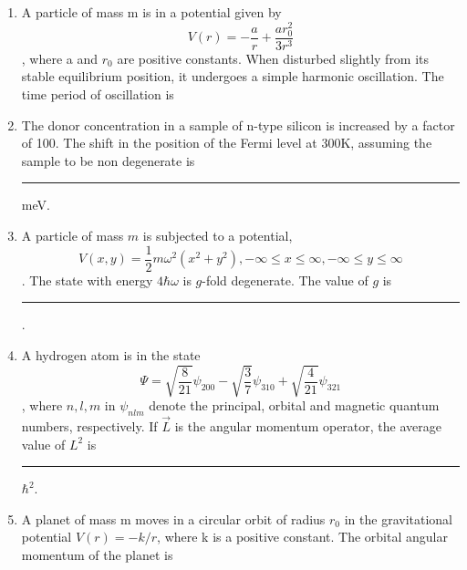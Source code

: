 \documentclass[journal,12pt,onecolumn]{IEEEtran}
\theoremstyle{remark}
\begin{document}
\begin{enumerate}
\item A particle of mass m is in a potential given by $$V(r) = -\frac{a}{r} + \frac{ar_0^2}{3r^3}$$, where a and $r_0$ are positive constants. When disturbed slightly from its stable equilibrium position, it undergoes a simple harmonic oscillation. The time period of oscillation is
\hfill{} \begin{enumerate}  \end{enumerate}

\item The donor concentration in a sample of n-type silicon is increased by a factor of 100. The shift in the position of the Fermi level at 300K, assuming the sample to be non degenerate is \rule{3cm}{0.4pt} meV. \hfill{}

\item A particle of mass $m$ is subjected to a potential, $$V(x,y) = \frac{1}{2} m\omega^2(x^2+y^2), -\infty \le x \le \infty, -\infty \le y \le \infty$$. The state with energy $4\hbar\omega$ is $g$-fold degenerate. The value of $g$ is \rule{3cm}{0.4pt}.\hfill{}

\item A hydrogen atom is in the state $$\Psi = \sqrt{\frac{8}{21}}\psi_{200} - \sqrt{\frac{3}{7}}\psi_{310} + \sqrt{\frac{4}{21}}\psi_{321}$$, where $n,l,m$ in $\psi_{nlm}$ denote the principal, orbital and magnetic quantum numbers, respectively. If $\vec{L}$ is the angular momentum operator, the average value of $L^2$ is \rule{3cm}{0.4pt} $\hbar^2$.\hfill{}

\item A planet of mass m moves in a circular orbit of radius $r_0$ in the gravitational potential $V(r) = -k/r$, where k is a positive constant. The orbital angular momentum of the planet is
\hfill{} \begin{enumerate}  \end{enumerate}


\end{enumerate}
\end{document}
